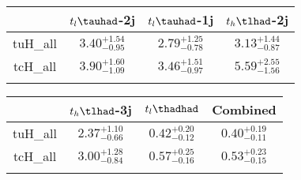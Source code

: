 \centering
\begin{tabular}{cccc} \toprule\toprule
 & $t_l\tauhad$-2j & $t_l\tauhad$-1j & $t_h\tlhad$-2j\\\midrule
tuH\_all & $3.40^{+1.54}_{-0.95}$ & $2.79^{+1.25}_{-0.78}$ & $3.13^{+1.44}_{-0.87}$\\
tcH\_all & $3.90^{+1.60}_{-1.09}$ & $3.46^{+1.51}_{-0.97}$ & $5.59^{+2.55}_{-1.56}$\\
\bottomrule\bottomrule\\
\end{tabular}
\begin{tabular}{cccc} \toprule\toprule
 & $t_h\tlhad$-3j & $t_l\thadhad$ & Combined\\\midrule
tuH\_all & $2.37^{+1.10}_{-0.66}$ & $0.42^{+0.20}_{-0.12}$ & $0.40^{+0.19}_{-0.11}$\\
tcH\_all & $3.00^{+1.28}_{-0.84}$ & $0.57^{+0.25}_{-0.16}$ & $0.53^{+0.23}_{-0.15}$\\
\bottomrule\bottomrule\\
\end{tabular}
